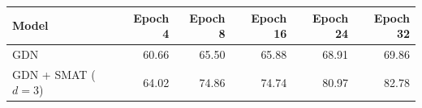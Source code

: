 \begin{tabular}{lrrrrr}
\toprule
Model & Epoch 4 & Epoch 8 & Epoch 16 & Epoch 24 & Epoch 32 \\
\midrule
GDN & 60.66 & 65.50 & 65.88 & 68.91 & 69.86 \\
GDN + SMAT ($d=3$) & 64.02 & 74.86 & 74.74 & 80.97 & 82.78 \\
\bottomrule
\end{tabular}
